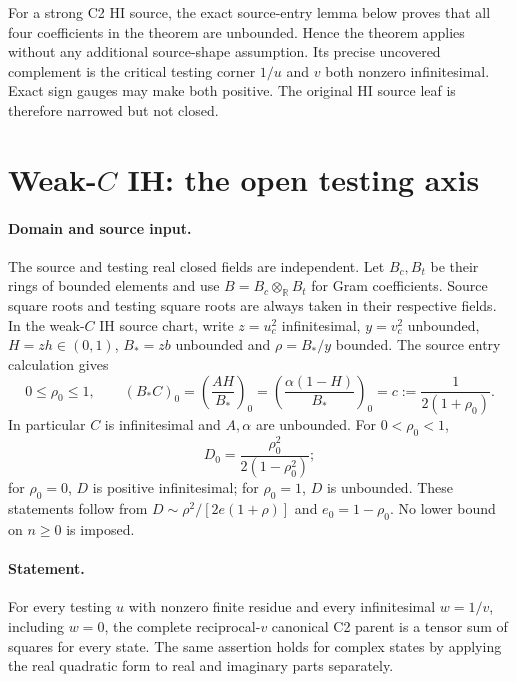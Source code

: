 For a strong C2 HI source, the exact source-entry lemma below proves
that all four coefficients in the theorem are unbounded. Hence the
theorem applies without any additional source-shape assumption.
Its precise uncovered complement is the critical testing corner
$1/u$ and $v$ both nonzero infinitesimal. Exact sign gauges may
make both positive.
The original HI source leaf is therefore narrowed but not closed.


\section{\texorpdfstring{Weak-$C$ IH: the open testing axis}{Weak-C IH: the open testing axis}}
\label{component:pf95b1c5fc32f}

\label{pf95b1c5fc32f:sec:weak-ih-open-axis}
\paragraph{Domain and source input.}
The source and testing real closed fields are independent.  Let $B_c,B_t$
be their rings of bounded elements and use $B=B_c\otimes_{\mathbb R}B_t$
for Gram coefficients.  Source square roots and testing square roots are
always taken in their respective fields.  In the weak-$C$ IH source chart,
write $z=u_c^2$ infinitesimal, $y=v_c^2$ unbounded,
$H=zh\in(0,1)$, $B_*=zb$ unbounded and $\rho=B_*/y$ bounded.
The source entry calculation gives
\[
 0\leq\rho_0\leq1,\qquad
 (B_*C)_0=\left(\frac{AH}{B_*}\right)_0
 =\left(\frac{\alpha(1-H)}{B_*}\right)_0
 =c:=\frac1{2(1+\rho_0)}.
\tag{OA1}
\]
In particular $C$ is infinitesimal and $A,\alpha$ are unbounded.
For $0<\rho_0<1$,
\[
 D_0=\frac{\rho_0^2}{2(1-\rho_0^2)};
\tag{OA2}
\]
for $\rho_0=0$, $D$ is positive infinitesimal; for $\rho_0=1$, $D$ is
unbounded.  These statements follow from
$D\sim\rho^2/[2e(1+\rho)]$ and $e_0=1-\rho_0$.
No lower bound on $n\geq0$ is imposed.

\paragraph{Statement.}
For every testing $u$ with nonzero finite residue and every infinitesimal
$w=1/v$, including $w=0$, the complete reciprocal-$v$ canonical C2 parent
is a tensor sum of squares for every state.  The same assertion holds for
complex states by applying the real quadratic form to real and imaginary
parts separately.

